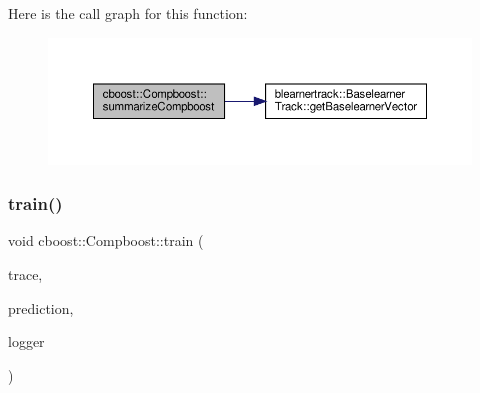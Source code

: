 Here is the call graph for this function\+:
\nopagebreak
\begin{figure}[H]
\begin{center}
\leavevmode
\includegraphics[width=350pt]{classcboost_1_1_compboost_a7be8cb767054ece895d535c1f468233e_cgraph}
\end{center}
\end{figure}
\mbox{\label{classcboost_1_1_compboost_a5d0ec331d3a75a19b89c54b67e64acad}} 
\subsubsection{\texorpdfstring{train()}{train()}}
{\footnotesize\ttfamily void cboost\+::\+Compboost\+::train (\begin{DoxyParamCaption}\item[{const unsigned int \&}]{trace,  }\item[{const arma\+::vec \&}]{prediction,  }\item[{\hyperlink{classloggerlist_1_1_logger_list}{loggerlist\+::\+Logger\+List} $\ast$}]{logger }\end{DoxyParamCaption})}

